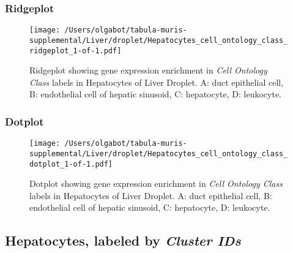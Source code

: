 \clearpage

\subsubsection{Ridgeplot}
\begin{figure}[h]
\centering
\texttt{[image: /Users/olgabot/tabula-muris-supplemental/Liver/droplet/Hepatocytes\_cell\_ontology\_class\_ridgeplot\_1-of-1.pdf]}

\caption{ Ridgeplot  showing gene expression enrichment in \emph{Cell Ontology Class} labels in Hepatocytes of Liver Droplet. A: duct epithelial cell, B: endothelial cell of hepatic sinusoid, C: hepatocyte, D: leukocyte.}
\end{figure}


\clearpage

\subsubsection{Dotplot}
\begin{figure}[h]
\centering
\texttt{[image: /Users/olgabot/tabula-muris-supplemental/Liver/droplet/Hepatocytes\_cell\_ontology\_class\_dotplot\_1-of-1.pdf]}

\caption{ Dotplot  showing gene expression enrichment in \emph{Cell Ontology Class} labels in Hepatocytes of Liver Droplet. A: duct epithelial cell, B: endothelial cell of hepatic sinusoid, C: hepatocyte, D: leukocyte.}
\end{figure}


\clearpage

\subsection{Hepatocytes, labeled by \emph{Cluster IDs}}
